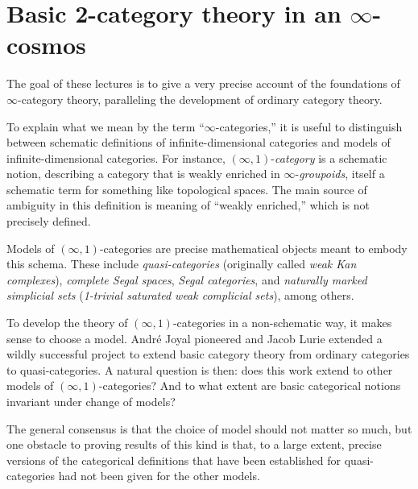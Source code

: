 \documentclass[12pt,reqno]{amsart}
\theoremstyle{plain}
\theoremstyle{definition}
\theoremstyle{remark}
\numberwithin{equation}{subsection}
\begin{document}
  \maketitle

\tableofcontents

\renewcommand\thesection{Lecture~\arabic{section}}
\section{Basic 2-category theory in an \texorpdfstring{$\infty$}{infinity}-cosmos}\label{sec:2-cat}
\renewcommand\thesection{\arabic{section}}

The goal of these lectures is to give a very precise account of the foundations of $\infty$-category theory, paralleling the development of ordinary category theory.

To explain what we  mean by the term ``$\infty$-categories,'' it is useful to distinguish between schematic definitions of infinite-dimensional categories and models of infinite-dimensional categories. For instance, $(\infty,1)$-\emph{category} is a schematic notion, describing a category that is weakly enriched in $\infty$-\emph{groupoids}, itself a schematic term for something like topological spaces. The main source of ambiguity in this definition is meaning of ``weakly enriched,'' which is not precisely defined.

Models of $(\infty,1)$-categories are precise mathematical objects meant to embody this schema. These include \emph{quasi-categories} (originally called \emph{weak Kan complexes}), \emph{complete Segal spaces}, \emph{Segal categories}, and \emph{naturally marked simplicial sets} (\emph{1-trivial saturated weak complicial sets}), among others.

To develop the theory of $(\infty,1)$-categories in a non-schematic way, it makes sense to choose a model. Andr\'e Joyal pioneered and Jacob Lurie extended a wildly successful project to extend basic category theory from ordinary categories to quasi-categories. A natural question is then: does this work extend to other models of $(\infty,1)$-categories? And to what extent are basic categorical notions invariant under change of models? 

The general consensus is that the choice of model should not matter so much, but one obstacle to proving results of this kind is that, to a large extent, precise versions of the categorical definitions that have been established for quasi-categories had not been given for the other models. 
\end{document}
